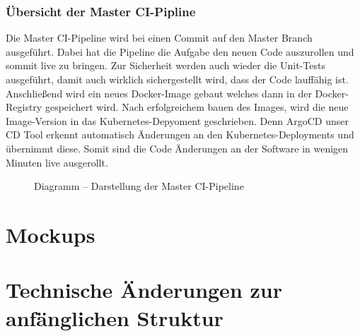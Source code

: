 \subsubsection{Übersicht der Master \ac{CI}-Pipline}
Die Master \ac{CI}-Pipeline wird bei einen Commit auf den Master Branch ausgeführt. Dabei hat die Pipeline die Aufgabe den neuen Code auszurollen und sommit live zu bringen.
Zur Sicherheit werden auch wieder die Unit-Tests ausgeführt, damit auch wirklich sichergestellt wird, dass der Code lauffähig ist. Anschließend wird ein neues Docker-Image gebaut
welches dann in der Docker-Registry gespeichert wird. Nach erfolgreichem bauen des Images, wird die neue Image-Version in das Kubernetes-Depyoment geschrieben. Denn ArgoCD unser \ac{CD} Tool
erkennt automatisch Änderungen an den Kubernetes-Deployments und übernimmt diese. Somit sind die Code Änderungen an der Software in wenigen Minuten live ausgerollt.
\begin{figure}[!htbp]
    \centering    
    \usetikzlibrary{positioning}
\caption{Diagramm – Darstellung der Master \ac{CI}-Pipeline}
\end{figure}

\section{Mockups}

\section{Technische Änderungen zur anfänglichen Struktur}
